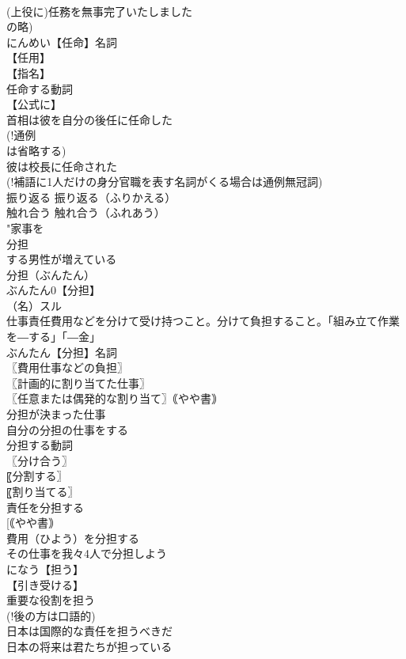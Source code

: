 \documentclass[8pt]{extreport}
\begin{document}
\begin{CJK}{UTF8}{min}
\\	(上役に)任務を無事完了いたしました
\\	の略)
\\	にんめい【任命】名詞
\\	【任用】
\\	【指名】
\\	任命する動詞
\\	【公式に】
\\	首相は彼を自分の後任に任命した
\\	(!通例 
\\	は省略する)
\\	彼は校長に任命された
\\	(!補語に1人だけの身分官職を表す名詞がくる場合は通例無冠詞) 
\\	振り返る		振り返る（ふりかえる）
\\	触れ合う		触れ合う（ふれあう）
\\	"家事を
\\	分担
\\	する男性が増えている
\\	分担（ぶんたん）
\\	ぶんたん0【分担】
\\	（名）スル
\\	仕事責任費用などを分けて受け持つこと。分けて負担すること。「組み立て作業を―する」「―金」
\\	ぶんたん【分担】名詞
\\	〖費用仕事などの負担〗
\\	〖計画的に割り当てた仕事〗
\\	〖任意または偶発的な割り当て〗｟やや書｠
\\	分担が決まった仕事
\\	自分の分担の仕事をする
\\	分担する動詞
\\	〖分け合う〗
\\	〖分割する〗
\\	〖割り当てる〗
\\	責任を分担する
\\	[｟やや書｠ 
\\	費用（ひよう）を分担する
\\	その仕事を我々4人で分担しよう
\\	になう【担う】
\\	【引き受ける】
\\	重要な役割を担う
\\	(!後の方は口語的)
\\	日本は国際的な責任を担うべきだ
\\	日本の将来は君たちが担っている

\end{CJK}
\end{document}
